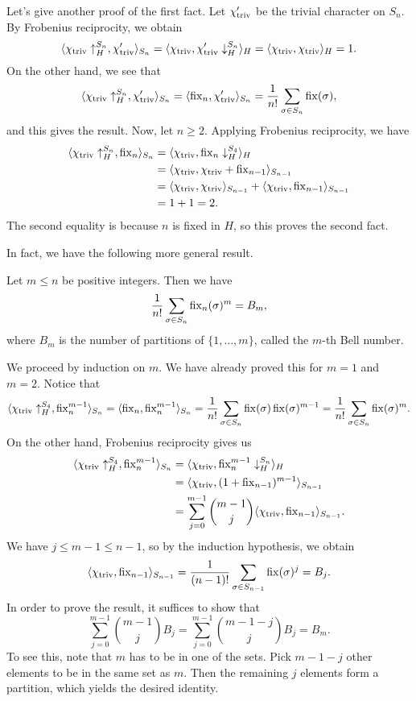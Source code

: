 Let's give another proof of the first fact. Let $\chi'_{\operatorname{triv}}$ be the trivial 
character on $S_n$. By Frobenius reciprocity, we obtain 
\[ \langle \chi_{\operatorname{triv}} \uparrow_H^{S_n}, \chi'_{\operatorname{triv}} \rangle_{S_n} 
= \langle \chi_{\operatorname{triv}}, \chi'_{\operatorname{triv}} \downarrow_H^{S_n} \rangle_H 
= \langle \chi_{\operatorname{triv}}, \chi_{\operatorname{triv}} \rangle_H = 1. \]
On the other hand, we see that 
\[ \langle \chi_{\operatorname{triv}} \uparrow_H^{S_n}, \chi'_{\operatorname{triv}} \rangle_{S_n} 
= \langle \operatorname{fix}_n, \chi'_{\operatorname{triv}} \rangle_{S_n} = \frac{1}{n!} \sum_{\sigma \in S_n} 
\operatorname{fix}(\sigma), \] 
and this gives the result. Now, let $n \geq 2$. Applying Frobenius reciprocity, 
we have 
\begin{align*}
    \langle \chi_{\operatorname{triv}} \uparrow_H^{S_n}, \operatorname{fix}_n \rangle_{S_n} 
    &= \langle \chi_{\operatorname{triv}}, \operatorname{fix}_n \downarrow_H^{S_4} \rangle_H \\ 
    &= \langle \chi_{\operatorname{triv}}, \chi_{\operatorname{triv}} + \operatorname{fix}_{n-1} \rangle_{S_{n-1}} \\ 
    &= \langle \chi_{\operatorname{triv}}, \chi_{\operatorname{triv}} \rangle_{S_{n-1}} 
    + \langle \chi_{\operatorname{triv}}, \operatorname{fix}_{n-1} \rangle_{S_{n-1}} \\ 
    &= 1 + 1 = 2. 
\end{align*}
The second equality is because $n$ is fixed in $H$, so this proves the second fact. 

In fact, we have the following more general result. 

\begin{prop}{}
    Let $m \leq n$ be positive integers. Then we have 
    \[ \frac{1}{n!} \sum_{\sigma \in S_n} \operatorname{fix}_n(\sigma)^m = B_m, \] 
    where $B_m$ is the number of partitions of $\{1, \dots, m\}$, called the 
    $m$-th Bell number. 
\end{prop}
\begin{pf}
    We proceed by induction on $m$. We have already proved this for $m = 1$ 
    and $m = 2$. Notice that 
    \[ \langle \chi_{\operatorname{triv}} \uparrow_H^{S_4}, \operatorname{fix}_n^{m-1} \rangle_{S_n} 
    = \langle \operatorname{fix}_n, \operatorname{fix}_n^{m-1} \rangle_{S_n} = \frac{1}{n!} 
    \sum_{\sigma \in S_n} \operatorname{fix}(\sigma) \operatorname{fix}(\sigma)^{m-1} 
    = \frac{1}{n!} \sum_{\sigma \in S_n} \operatorname{fix}(\sigma)^m. \] 
    On the other hand, Frobenius reciprocity gives us 
    \begin{align*}
        \langle \chi_{\operatorname{triv}} \uparrow_H^{S_4}, \operatorname{fix}_n^{m-1} \rangle_{S_n} 
        &= \langle \chi_{\operatorname{triv}}, \operatorname{fix}_n^{m-1} \downarrow_H^{S_n} \rangle_H \\
        &= \langle \chi_{\operatorname{triv}}, (1 + \operatorname{fix}_{n-1})^{m-1} \rangle_{S_{n-1}} \\
        &= \sum_{j=0}^{m-1} \binom{m-1}{j} \langle \chi_{\operatorname{triv}}, \operatorname{fix}_{n-1} \rangle_{S_{n-1}}. 
    \end{align*}
    We have $j \leq m-1 \leq n-1$, so by the induction hypothesis, we obtain 
    \[ \langle \chi_{\operatorname{triv}}, \operatorname{fix}_{n-1} \rangle_{S_{n-1}} 
    = \frac{1}{(n-1)!} \sum_{\sigma \in S_{n-1}} \operatorname{fix}(\sigma)^j = B_j. \] 
    In order to prove the result, it suffices to show that 
    \[ \sum_{j=0}^{m-1} \binom{m-1}{j} B_j = \sum_{j=0}^{m-1} \binom{m-1-j}{j} B_j = B_m. \] 
    To see this, note that $m$ has to be in one of the sets. Pick $m - 1 - j$ 
    other elements to be in the same set as $m$. Then the remaining $j$ 
    elements form a partition, which yields the desired identity. 
\end{pf}
